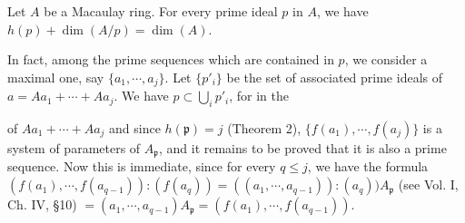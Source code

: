 Let $A$ be a Macaulay ring. For every prime ideal $p$ in $A$, we have $h(p) + \dim (A/p) = \dim (A)$.

In fact, among the prime sequences which are contained in $p$, we consider a maximal one, say $\{a_1, \cdots, a_j\}$. Let $\{p'_i\}$ be the set of associated prime ideals of $a = Aa_1 + \cdots + Aa_j$. We have $p \subset \bigcup_i p'_i$, for in the

of $Aa_1 + \cdots + Aa_j$ and since $h(\mathfrak{p}) = j$ (Theorem 2), $\{f(a_1), \cdots, f(a_j)\}$ is a system of parameters of $A_\mathfrak{p}$, and it remains to be proved that it is also a prime sequence. Now this is immediate, since for every $q \leq j$, we have the formula $(f(a_1), \cdots, f(a_{q-1})) : (f(a_q)) = ((a_1, \cdots, a_{q-1})) : (a_q)) A_\mathfrak{p}$ (see Vol. I, Ch. IV, §10) $= (a_1, \cdots, a_{q-1}) A_\mathfrak{p} = (f(a_1), \cdots, f(a_{q-1}))$.